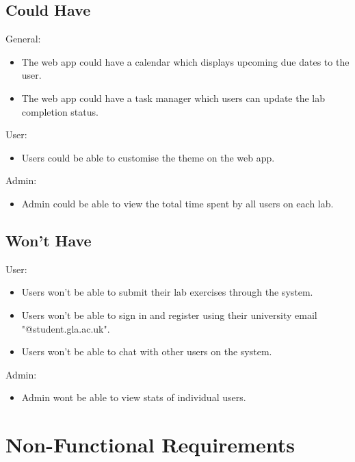 \documentclass{l4proj}
\begin{document}
\subsection {Could Have}

General:

\begin{itemize}
    \item 
    The web app could have a calendar which displays upcoming due dates to the user.
    \item 
    The web app could have a task manager which users can update the lab completion status.
\end{itemize}

User:

\begin{itemize}
    \item 
    Users could be able to customise the theme on the web app.
\end{itemize}

Admin:

\begin{itemize}
    \item 
    Admin could be able to view the total time spent by all users on each lab.
\end{itemize}

\subsection {Won't Have}

User:

\begin{itemize}
    \item 
    Users won't be able to submit their lab exercises through the system.
    \item
    Users won't be able to sign in and register using their university email "@student.gla.ac.uk".
    \item
    Users won't be able to chat with other users on the system.
\end{itemize}

Admin:

\begin{itemize}
    \item 
    Admin wont be able to view stats of individual users.
\end{itemize}

\section{Non-Functional Requirements}
\end{document}
